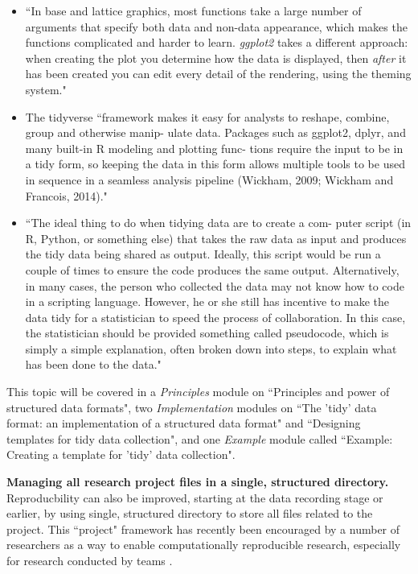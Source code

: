 \documentclass[pdftex,english,11pt,parskip=half]{scrartcl}
\begin{document}
\begin{itemize}
\item ``In base and lattice graphics, most functions take a large number of arguments that specify both data and non-data appearance, which makes the functions complicated and harder to learn. \textit{ggplot2} takes a different approach: when creating the plot you determine how the data is displayed, then \textit{after} it has been created you can edit every detail of the rendering, using the theming system." \cite{wickham2016ggplot2}
\item The tidyverse ``framework makes it easy for analysts to reshape, combine, group and otherwise manip- ulate data. Packages such as ggplot2, dplyr, and many built-in R modeling and plotting func- tions require the input to be in a tidy form, so keeping the data in this form allows multiple tools to be used in sequence in a seamless analysis pipeline (Wickham, 2009; Wickham and Francois, 2014)." \cite{robinson2014broom}
\item ``The ideal thing to do when tidying data are to create a com- puter script (in R, Python, or something else) that takes the raw data as input and produces the tidy data being shared as output. Ideally, this script would be run a couple of times to ensure the code produces the same output. Alternatively, in many cases, the person who collected the data may not know how to code in a scripting language. However, he or she still has incentive to make the data tidy for a statistician to speed the process of collaboration. In this case, the statistician should be provided something called pseudocode, which is simply a simple explanation, often broken down into steps, to explain what has been done to the data." \cite{ellis2018share}
\end{itemize}

This topic will
be covered in a \textit{Principles} module on ``Principles and power of
structured data formats", two \textit{Implementation} modules on ``The 'tidy'
data format: an implementation of a structured data format" and ``Designing
templates for tidy data collection", and one \textit{Example} module called
``Example: Creating a template for 'tidy' data collection".

\textbf{Managing all research project files in a single, structured directory.}
Reproducbility can also be improved, starting at the data recording stage or
earlier, by using single, structured directory to store all files related to the
project. This ``project" framework has recently been encouraged by a number of
researchers as a way to enable computationally reproducible research, especially
for research conducted by teams \cite{marwick2018packaging,
parker2017opinionated, lowndes2017our}. 
\end{document}
